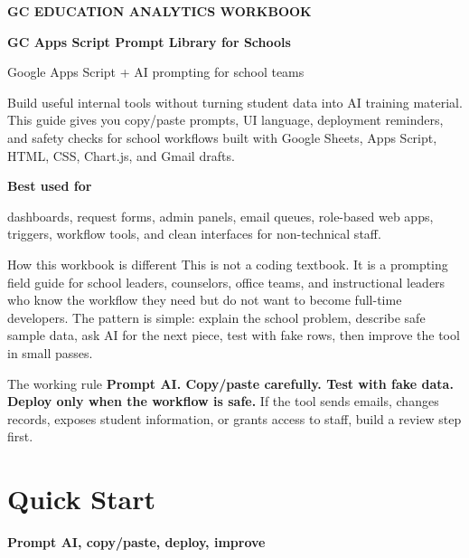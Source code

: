 \documentclass[10pt]{article}
\newcommand{\sectionkicker}[1]{\vspace{0.2em}{\small\bfseries\color{GCTeal}#1}\vspace{-0.15em}}
\newcommand{\tighttitle}[1]{{\Large\bfseries\color{GCNavy}#1}\par}
\begin{document}
\begin{darkband}
\raggedright
{\color{GCWhite}\small\bfseries GC EDUCATION ANALYTICS WORKBOOK}\par
\vspace{0.7em}
{\color{GCWhite}\fontsize{24}{28}\selectfont\bfseries GC Apps Script Prompt Library for Schools}\par
\vspace{0.5em}
{\color{GCPanelDark}\Large Google Apps Script + AI prompting for school teams}\par
\vspace{1.1em}
{\color{GCPanelDark}\normalsize Build useful internal tools without turning student data into AI training material. This guide gives you copy/paste prompts, UI language, deployment reminders, and safety checks for school workflows built with Google Sheets, Apps Script, HTML, CSS, Chart.js, and Gmail drafts.}\par
\vspace{1.0em}
{\color{GCWhite}\small\bfseries Best used for}\par
{\color{GCPanelDark}\small dashboards, request forms, admin panels, email queues, role-based web apps, triggers, workflow tools, and clean interfaces for non-technical staff.}
\end{darkband}

\vspace{0.8em}
\begin{textbox}{How this workbook is different}
This is not a coding textbook. It is a prompting field guide for school leaders, counselors, office teams, and instructional leaders who know the workflow they need but do not want to become full-time developers. The pattern is simple: explain the school problem, describe safe sample data, ask AI for the next piece, test with fake rows, then improve the tool in small passes.
\end{textbox}

\begin{textbox}{The working rule}
\textbf{Prompt AI. Copy/paste carefully. Test with fake data. Deploy only when the workflow is safe.} If the tool sends emails, changes records, exposes student information, or grants access to staff, build a review step first.
\end{textbox}

\vspace{0.3em}
\tableofcontents
\newpage

\section{Quick Start}
\sectionkicker{THE SIMPLE LOOP}
\tighttitle{Prompt AI, copy/paste, deploy, improve}
\end{document}

